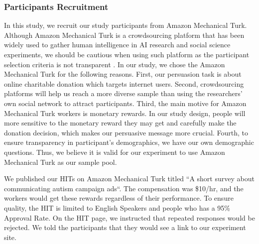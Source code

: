 
\subsubsection{Participants Recruitment}
In this study, we recruit our study participants from Amazon Mechanical Turk. Although Amazon Mechanical Turk is a crowdsourcing platform that has been widely used to gather human intelligence in AI research and social science experiments, we should be cautious when using such platform as the participant selection criteria is not transparent \cite{landers2015inconvenient}. In our study, we chose the Amazon Mechanical Turk for the following reasons. First, our persuasion task is about online charitable donation which targets internet users. Second, crowdsourcing platforms will help us reach a more diverse sample than using the researchers' own social network to attract participants. Third, the main motive for Amazon Mechanical Turk workers is monetary rewards. In our study design, people will more sensitive to the monetary reward they may get and carefully make the donation decision, which makes our persuasive message more crucial. Fourth, to ensure transparency in participant's demographics, we have our own demographic questions. Thus, we believe it is valid for our experiment to use Amazon Mechanical Turk as our sample pool. 

We published our HITs on Amazon Mechanical Turk titled ``A short survey about communicating autism campaign ads``. The compensation was \$10/hr, and the workers would get these rewards regardless of their performance. To ensure quality, the HIT is limited to English Speakers and people who has a 95\% Approval Rate. On the HIT page, we instructed that repeated responses would be rejected. We told the participants that they would see a link to our experiment site. 
